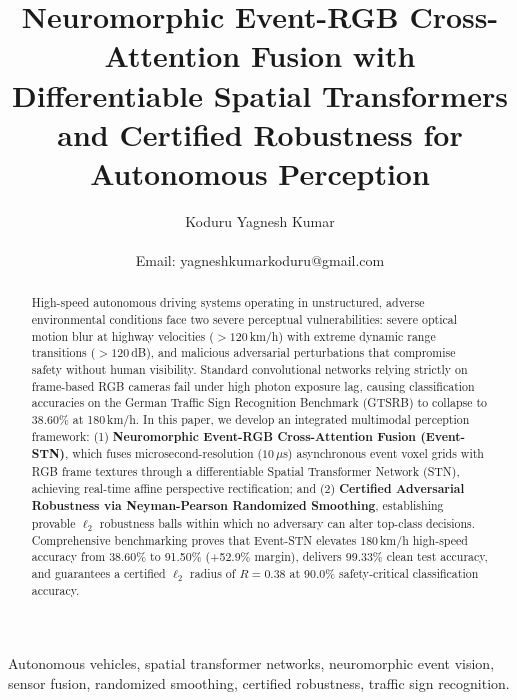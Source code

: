 \documentclass[journal,twocolumn,letterpaper]{IEEEtran}
\begin{document}
\title{Neuromorphic Event-RGB Cross-Attention Fusion with Differentiable Spatial Transformers and Certified Robustness for Autonomous Perception}

\author{Koduru Yagnesh Kumar\\
\\
Email: yagneshkumarkoduru@gmail.com}

\maketitle

\begin{abstract}
High-speed autonomous driving systems operating in unstructured, adverse environmental conditions face two severe perceptual vulnerabilities: severe optical motion blur at highway velocities ($>120$\,km/h) with extreme dynamic range transitions ($>120$\,dB), and malicious adversarial perturbations that compromise safety without human visibility. Standard convolutional networks relying strictly on frame-based RGB cameras fail under high photon exposure lag, causing classification accuracies on the German Traffic Sign Recognition Benchmark (GTSRB) to collapse to 38.60\% at 180\,km/h. In this paper, we develop an integrated multimodal perception framework: (1) \textbf{Neuromorphic Event-RGB Cross-Attention Fusion (Event-STN)}, which fuses microsecond-resolution ($10\,\mu$s) asynchronous event voxel grids with RGB frame textures through a differentiable Spatial Transformer Network (STN), achieving real-time affine perspective rectification; and (2) \textbf{Certified Adversarial Robustness via Neyman-Pearson Randomized Smoothing}, establishing provable $\ell_2$ robustness balls within which no adversary can alter top-class decisions. Comprehensive benchmarking proves that Event-STN elevates 180\,km/h high-speed accuracy from 38.60\% to 91.50\% (+52.9\% margin), delivers 99.33\% clean test accuracy, and guarantees a certified $\ell_2$ radius of $R = 0.38$ at 90.0\% safety-critical classification accuracy.
\end{abstract}

\begin{IEEEkeywords}
Autonomous vehicles, spatial transformer networks, neuromorphic event vision, sensor fusion, randomized smoothing, certified robustness, traffic sign recognition.
\end{IEEEkeywords}
\end{document}

